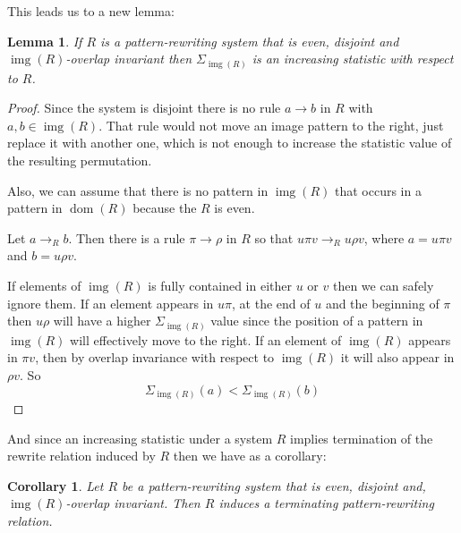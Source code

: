 \documentclass[a4paper, 11pt, english]{article}
\newcommand{\patternrule}{ \to \!}
\newtheorem{lemma}[theorem]{Lemma}
\newtheorem{corollary}[theorem]{Corollary}
\theoremstyle{definition}
\DeclareMathOperator{\dom}{dom}
\DeclareMathOperator{\img}{img}
\begin{document}
This leads us to a new lemma:
\begin{lemma}
  If $R$ is a pattern-rewriting system that is even, disjoint and $\img(R)$-overlap invariant 
  then $\Sigma_{\img(R)}$ is an increasing statistic with respect to $R$. 
\end{lemma}
\begin{proof}
  Since the system is disjoint there is no rule $a \patternrule b$ in $R$ with $a, b \in \img(R)$.
  That rule would not move an image pattern to the right, just replace it with another one, which is
  not enough to increase the statistic value of the resulting permutation.

  Also, we can assume that there is no pattern in $\img(R)$ that occurs in a pattern in $\dom(R)$
  because the $R$ is even.

  Let $a \to_R b$. Then there is a rule $\pi \patternrule \rho$ in
  $R$ so that $u \pi v \to_R u \rho v$, where $a = u \pi v$ and $b =
  u \rho v$. 

  If elements of $\img(R)$ is fully contained in either $u$ or $v$ then we
  can safely ignore them. If an element appears in $u\pi$, at the end of $u$ and the beginning of
  $\pi$ then $u \rho$ will have a higher $\Sigma_{\img(R)}$ value since the position of a pattern in $\img(R)$ will
  effectively move to the right. If an element of $\img(R)$ appears in $\pi v$,
  then by overlap invariance with respect to $\img(R)$ it will also appear in $\rho v$.
  So
  \[
      \Sigma_{\img(R)}(a) < \Sigma_{\img(R)}(b)
  \]

\end{proof}

And since an increasing statistic under a system $R$ implies termination of the rewrite relation
induced by $R$ then we have as a corollary:

\begin{corollary}
    Let $R$ be a pattern-rewriting system that is even, disjoint and, $\img(R)$-overlap invariant. 
    Then $R$ induces a terminating pattern-rewriting relation.
\end{corollary}
\end{document}
